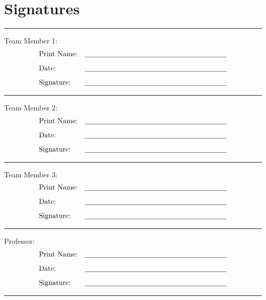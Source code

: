 \documentclass[11pt, letterpaper, notitlepage]{article}
\begin{document}
\section[3]{Signatures}

\vspace{1em}\hrule\vspace{1em}

Team Member 1:
\begin{align*}
     & \text{Print Name:} & \text{\underline{\hspace{7cm}}} \\[0.5em]
     & \text{Date:}       & \text{\underline{\hspace{7cm}}} \\[0.5em]
     & \text{Signature:}  & \text{\underline{\hspace{7cm}}}
\end{align*}

\vspace{1em}\hrule\vspace{1em}

\noindent
Team Member 2:
\begin{align*}
     & \text{Print Name:} & \text{\underline{\hspace{7cm}}} \\[0.5em]
     & \text{Date:}       & \text{\underline{\hspace{7cm}}} \\[0.5em]
     & \text{Signature:}  & \text{\underline{\hspace{7cm}}}
\end{align*}

\vspace{1em}\hrule\vspace{1em}

\noindent
Team Member 3:
\begin{align*}
     & \text{Print Name:} & \text{\underline{\hspace{7cm}}} \\[0.5em]
     & \text{Date:}       & \text{\underline{\hspace{7cm}}} \\[0.5em]
     & \text{Signature:}  & \text{\underline{\hspace{7cm}}}
\end{align*}

\vspace{1em}\hrule\vspace{1em}

\noindent
Professor:
\begin{align*}
     & \text{Print Name:} & \text{\underline{\hspace{7cm}}} \\[0.5em]
     & \text{Date:}       & \text{\underline{\hspace{7cm}}} \\[0.5em]
     & \text{Signature:}  & \text{\underline{\hspace{7cm}}}
\end{align*}

\vspace{1em}\hrule\vspace{1em}
\end{document}
